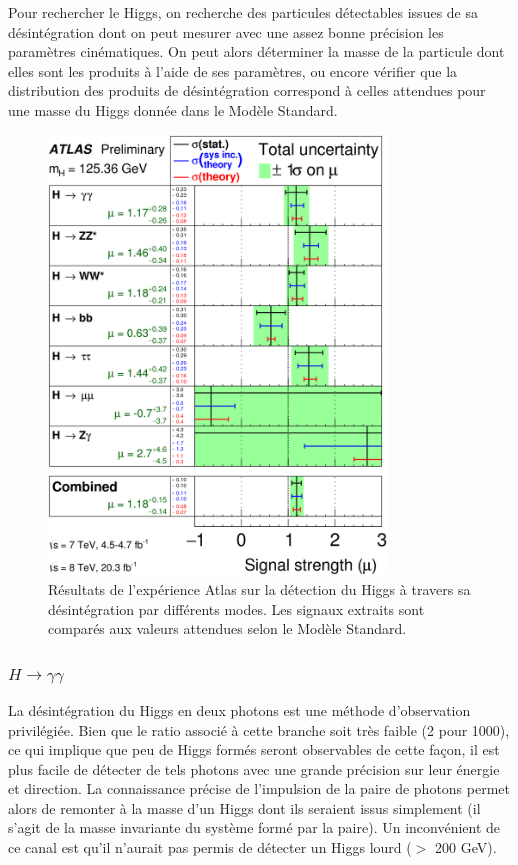 \documentclass[11pt]{article} %
\begin{document}
Pour rechercher le Higgs, on recherche des particules détectables issues de sa désintégration dont on peut mesurer avec une assez bonne précision les paramètres cinématiques. On peut alors déterminer la masse de la particule dont elles sont les produits à l'aide de ses paramètres, ou encore vérifier que la distribution des produits de désintégration correspond à celles attendues pour une masse du Higgs donnée dans le Modèle Standard.

\begin{figure}[H]
\centering
  \caption{Résultats de l'expérience Atlas sur la détection du Higgs à travers sa désintégration par différents modes. Les signaux extraits sont comparés aux valeurs attendues selon le Modèle Standard.}
 \includegraphics[width=0.8\textwidth]{../images/fig_02.png}
\end{figure}


\subsubsection{$H \to \gamma \gamma$}

La désintégration du Higgs en deux photons est une méthode d'observation privilégiée. Bien que le ratio associé à cette branche soit très faible (2 pour 1000), ce qui implique que peu de Higgs formés seront observables de cette façon, il est plus facile de détecter de tels photons avec une grande précision sur leur énergie et direction. La connaissance précise de l'impulsion de la paire de photons permet alors de remonter à la masse d'un Higgs dont ils seraient issus simplement (il s'agit de la masse invariante du système formé par la paire). Un inconvénient de ce canal est qu'il n'aurait pas permis de détecter un Higgs lourd ($>$ 200 GeV).
\end{document}
